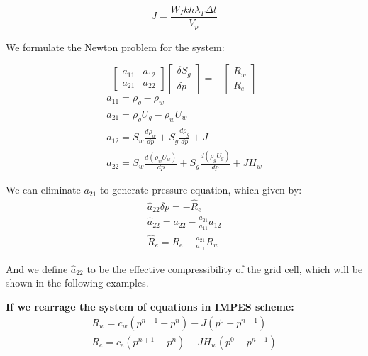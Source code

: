 \documentclass[11pt]{article}
\begin{document}
    \begin{equation}
        J = \frac{W_Ikh\lambda_T\Delta t}{V_p}
    \end{equation}
    
    We formulate the Newton problem for the system:
    
    \begin{equation}
        \begin{bmatrix}
          a_{11} & a_{12} \\ 
          a_{21} & a_{22}
        \end{bmatrix}
        \begin{bmatrix}
          \delta S_g \\
          \delta p
        \end{bmatrix} = -
        \begin{bmatrix}
          R_w \\
          R_e
        \end{bmatrix}
    \end{equation}
    \begin{gather}
        a_{11} = \rho_g-\rho_w \\
        a_{21} = \rho_gU_g-\rho_wU_w \\
        a_{12} = S_w\frac{d\rho_w}{dp} + S_g\frac{d\rho_g}{dp} + J \\
        a_{22} = S_w\frac{d(\rho_wU_w)}{dp} + S_g\frac{d(\rho_gU_g)}{dp} + JH_w
    \end{gather}
    
    We can eliminate $a_{21}$ to generate pressure equation, which given by:
    \begin{gather}
        \hat{a}_{22}\delta p = -\hat{R}_e \\
        \hat{a}_{22} = a_{22} - \frac{a_{21}}{a_{11}}a_{12} \\
        \hat{R}_e = R_e - \frac{a_{21}}{a_{11}}R_w
    \end{gather}
    
    And we define $\hat{a}_{22}$ to be the effective compressibility of the grid
    cell, which will be shown in the following examples.
    
    \vspace{10pt}
    \noindent\textbf{If we rearrage the system of equations in IMPES scheme:}
    \begin{gather}
        R_w=c_w(p^{n+1}-p^n) - J(p^0-p^{n+1}) \\
        R_e=c_e(p^{n+1}-p^n) - JH_w(p^0-p^{n+1})
    \end{gather}
    
\end{document}
